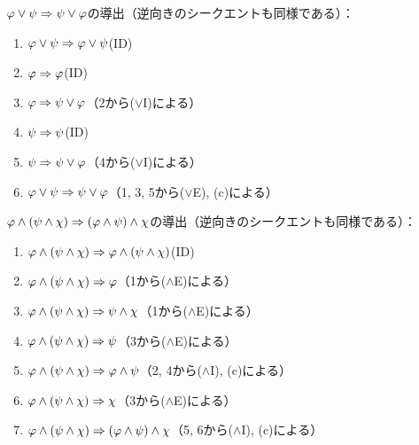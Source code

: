 \(\varphi \lor \psi \Rightarrow \psi \lor \varphi\)の導出（逆向きのシークエントも同様である）：
\begin{enumerate}
	\item \(\varphi \lor \psi \Rightarrow \varphi \lor \psi\)\quad (ID)
	\item \(\varphi \Rightarrow \varphi\)\quad (ID)
	\item \(\varphi \Rightarrow \psi \lor \varphi\)\quad （2から(\(\lor\)I)による）
	\item \(\psi \Rightarrow \psi\)\quad (ID)
	\item \(\psi \Rightarrow \psi \lor \varphi\)\quad （4から(\(\lor\)I)による）
	\item \(\varphi \lor \psi \Rightarrow \psi \lor \varphi\)\quad （1, 3, 5から(\(\lor\)E), (c)による）
\end{enumerate}

\(\varphi \land \paren{\psi \land \chi} \sequent \paren{\varphi \land \psi} \land \chi\)の導出（逆向きのシークエントも同様である）：
\begin{enumerate}
	\item \(\varphi \land \paren{\psi \land \chi} \sequent \varphi \land \paren{\psi \land \chi}\)\quad (ID)
	\item \(\varphi \land \paren{\psi \land \chi} \sequent \varphi\)\quad （1から(\(\land\)E)による）
	\item \(\varphi \land \paren{\psi \land \chi} \sequent \psi \land \chi\)\quad （1から(\(\land\)E)による）
	\item \(\varphi \land \paren{\psi \land \chi} \sequent \psi\)\quad （3から(\(\land\)E)による）
	\item \(\varphi \land \paren{\psi \land \chi} \sequent \varphi \land \psi\)\quad （2, 4から(\(\land\)I), (c)による）
	\item \(\varphi \land \paren{\psi \land \chi} \sequent \chi\)\quad （3から(\(\land\)E)による）
	\item \(\varphi \land \paren{\psi \land \chi} \sequent \paren{\varphi \land \psi} \land \chi\)\quad （5, 6から(\(\land\)I), (c)による）
\end{enumerate}

